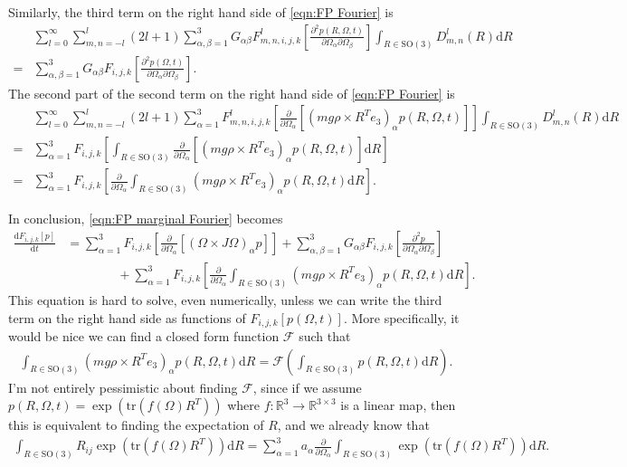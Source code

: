 \documentclass[10pt]{article}
\newcommand{\SO}{\ensuremath{\mathrm{SO}(3)}}
\newcommand{\tr}[1]{\ensuremath{\mathrm{tr}\left( #1 \right)}}
\newcommand{\diff}[1]{\mathrm{d}#1}
\newcommand{\real}{\ensuremath{\mathbb{R}}}
\begin{document}
Similarly, the third term on the right hand side of \eqref{eqn:FP Fourier} is
\begin{align*}
	&\sum_{l=0}^\infty \sum_{m,n=-l}^l (2l+1) \sum_{\alpha,\beta=1}^3 G_{\alpha\beta} F^l_{m,n,i,j,k} \left[ \frac{\partial^2 p(R,\Omega,t)}{\partial\Omega_\alpha \partial\Omega_\beta} \right] \int_{R\in\SO} D^l_{m,n}(R) \diff{R} \\
	= &\sum_{\alpha,\beta=1}^3 G_{\alpha\beta} F_{i,j,k} \left[ \frac{\partial^2 p(\Omega,t)}{\partial\Omega_\alpha \partial\Omega_\beta} \right].
\end{align*}
The second part of the second term on the right hand side of \eqref{eqn:FP Fourier} is
\begin{align*}
	&\sum_{l=0}^\infty \sum_{m,n=-l}^l (2l+1) \sum_{\alpha=1}^3 F^l_{m,n,i,j,k}\left[ \frac{\partial}{\partial\Omega_\alpha} [(mg\rho\times R^Te_3)_\alpha p(R,\Omega,t)] \right] \int_{R\in\SO} D^l_{m,n}(R) \diff{R} \\
	= &\sum_{\alpha=1}^3 F_{i,j,k} \left[ \int_{R\in\SO} \frac{\partial}{\partial\Omega_\alpha} [(mg\rho\times R^Te_3)_\alpha p(R,\Omega,t)] \diff{R} \right] \\
	= &\sum_{\alpha=1}^3 F_{i,j,k} \left[ \frac{\partial}{\partial\Omega_\alpha} \int_{R\in\SO} (mg\rho\times R^Te_3)_\alpha p(R,\Omega,t) \diff{R} \right].
\end{align*}

In conclusion, \eqref{eqn:FP marginal Fourier} becomes
\begin{align}
	\frac{\diff F_{i,j,k}[p]}{\diff{t}} &= \sum_{\alpha=1}^3 F_{i,j,k}\left[ \frac{\partial}{\partial\Omega_\alpha} [(\Omega\times J\Omega)_\alpha p] \right] + \sum_{\alpha,\beta=1}^3 G_{\alpha\beta} F_{i,j,k} \left[ \frac{\partial^2 p}{\partial\Omega_\alpha \partial\Omega_\beta} \right] \nonumber \\
	&\qquad\qquad + \sum_{\alpha=1}^3 F_{i,j,k} \left[ \frac{\partial}{\partial\Omega_\alpha} \int_{R\in\SO} (mg\rho\times R^Te_3)_\alpha p(R,\Omega,t) \diff{R} \right].
\end{align}
This equation is hard to solve, even numerically, unless we can write the third term on the right hand side as functions of $F_{i,j,k}[p(\Omega,t)]$.
More specifically, it would be nice we can find a closed form function $\mathcal{F}$ such that
\begin{align}
	\int_{R\in\SO} (mg\rho\times R^Te_3)_\alpha p(R,\Omega,t) \diff{R} =  \mathcal{F}\left( \int_{R\in\SO} p(R,\Omega,t) \diff{R} \right).
\end{align}
I'm not entirely pessimistic about finding $\mathcal{F}$, since if we assume $p(R,\Omega,t) = \exp(\tr{f(\Omega)R^T})$ where $f:\real^3\to\real^{3\times 3}$ is a linear map, then this is equivalent to finding the expectation of $R$, and we already know that
\begin{align*}
	\int_{R\in\SO} R_{ij} \exp(\tr{f(\Omega)R^T}) \diff{R} = \sum_{\alpha=1}^{3} a_{\alpha} \frac{\partial}{\partial\Omega_\alpha} \int_{R\in\SO} \exp(\tr{f(\Omega)R^T}) \diff{R}.
\end{align*}
\end{document}
